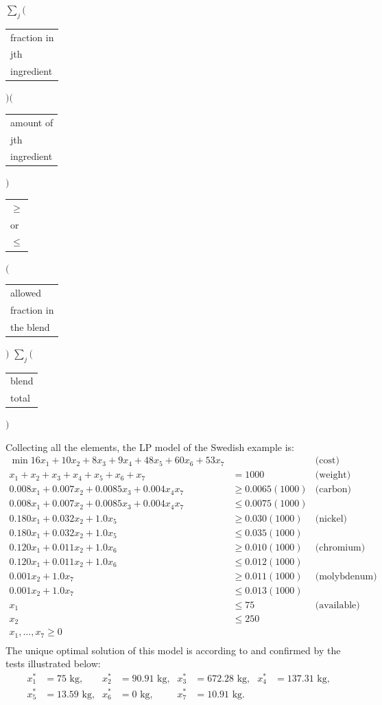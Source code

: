 \documentclass[a4paper,10 pt,titlepage,twoside]{book}
\theoremstyle{plain}
\theoremstyle{definition}
\theoremstyle{remark}
\begin{document}
$\sum_{j}\Bigg($\begin{tabular}{l}
 fraction in\\
jth\\
ingredient\\
\end{tabular}
$\Bigg)$$\Bigg($\begin{tabular}{l}
 amount of\\
jth\\
ingredient\\
\end{tabular}$\Bigg)$
\begin{tabular}{l}
	$\geq$\\
	or\\
	$\leq$\\
\end{tabular}
	$\Bigg($\begin{tabular}{l}
		allowed\\
		fraction in\\
		the blend\\
	\end{tabular}
	$\Bigg)$
	$\sum_{j}\Big($\begin{tabular}{l}
		blend\\
		total\\
	\end{tabular}
	$\Big)$
	
	
\bigskip
Collecting all the elements, the LP model of the Swedish example is: 
\begin{align*}
\min16x_{1}+10x_{2}+8x_{3}+9x_{4}+48x_{5}+60x_{6}+53x_{7}& &\text{(cost)}&\\
x_{1}+x_{2}+x_{3}+x_{4}+x_{5}+x_{6} + x_{7}&= 1000&\text{(weight)}&\\
0.008x_{1}+0.007x_{2}+0.0085x_{3}+0.004x_{4}x_{7}&\geq 0.0065(1000)&\text{(carbon)}&\\
0.008x_{1}+0.007x_{2} + 0.0085x_{3} + 0.004x_{4}x_{7}&\leq 0.0075(1000)&\\
0.180x_{1}+0.032x_{2} + 1.0x_{5}&\geq 0.030(1000)& \text{(nickel)}&\\
0.180x_{1}+0.032x_{2} + 1.0x_{5}&\leq 0.035(1000)&\\
0.120x_{1}+0.011x_{2} + 1.0x_{6}&\geq 0.010(1000)& \text{(chromium)}&\\
0.120x_{1}+0.011x_{2} + 1.0x_{6}&\leq 0.012(1000)&\\
0.001x_{2} + 1.0x_{7}&\geq 0.011(1000)& \text{(molybdenum)}&\\
0.001x_{2} + 1.0x_{7}&\leq 0.013(1000)&\\
x_{1}&\leq 75&\text{(available)}&\\
x_{2}&\leq 250 &&\\
x_{1},\dots, x_{7}\geq 0\\
\end{align*}
The unique optimal solution of this model is according to \cite{RR} and confirmed by the tests illustrated below:
\begin{align*}
x_{1}^{*} &=  75\text{ kg,} & x_{2}^{*}&=  90.91\text{ kg,} & x_{3}^{*} &= 672.28 \text{ kg,} & x_{4}^{*} &= 137.31 \text{ kg,}\\
x_{5}^{*} &= 13.59 \text{ kg,}& x_{6}^{*}&= 0\text{ kg,}  & x_{7}^{*} &= 10.91 \text{ kg.} &&\\
\end{align*}
\end{document}
